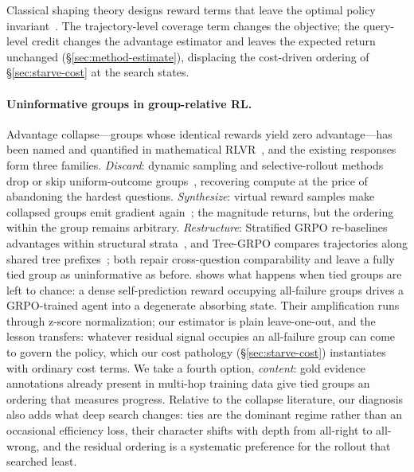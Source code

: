 Classical shaping theory designs reward terms that leave the optimal
policy invariant~\citep{ng1999policy}. The trajectory-level coverage
term changes the objective; the query-level credit changes the
advantage estimator and leaves the expected return unchanged
(\S\ref{sec:method-estimate}), displacing the cost-driven ordering of
\S\ref{sec:starve-cost} at the search states.

\paragraph{Uninformative groups in group-relative RL.} Advantage
collapse---groups whose identical rewards yield zero
advantage---has been named and quantified in mathematical
RLVR~\citep{he2026collapse}, and the existing responses form three
families. \emph{Discard}: dynamic sampling and selective-rollout
methods drop or skip uniform-outcome
groups~\citep{yu2025dapo,greso2025,xu2026downsampling}, recovering
compute at the price of abandoning the hardest questions.
\emph{Synthesize}: virtual reward samples make collapsed groups emit
gradient again~\citep{he2026collapse}; the magnitude returns, but the
ordering within the group remains arbitrary. \emph{Restructure}:
Stratified GRPO re-baselines advantages within structural
strata~\citep{zhu2025grpo}, and Tree-GRPO compares trajectories along
shared tree prefixes~\citep{Ji2026tree}; both repair cross-question
comparability and leave a fully tied group as uninformative as
before. \citet{wang2026darkroom} shows what happens when tied groups
are left to chance: a dense self-prediction reward occupying
all-failure groups drives a GRPO-trained agent into a degenerate
absorbing state. Their amplification runs through z-score
normalization; our estimator is plain leave-one-out, and the lesson
transfers: whatever residual signal occupies an all-failure group can
come to govern the policy, which our cost pathology
(\S\ref{sec:starve-cost}) instantiates with ordinary cost terms. We take a fourth option, \emph{content}: gold evidence
annotations already present in multi-hop training data give tied
groups an ordering that measures progress. Relative to the collapse
literature, our diagnosis also adds what deep search changes: ties
are the dominant regime rather than an occasional efficiency loss,
their character shifts with depth from all-right to all-wrong, and the
residual ordering is a systematic preference for the rollout that
searched least.

